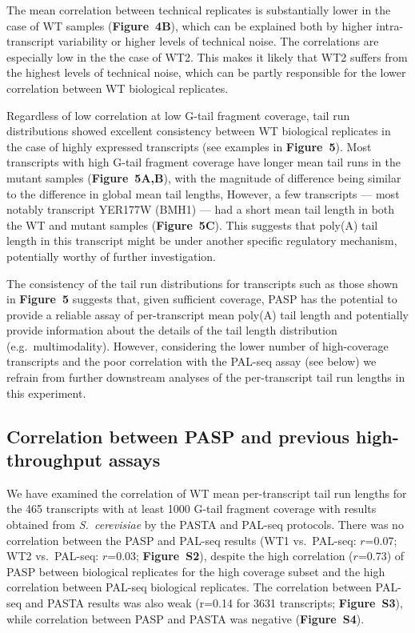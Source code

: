 \documentclass[10pt]{article}
\begin{document}
The mean correlation between technical replicates is substantially lower in the case of WT samples (\textbf{Figure~4B}), which can be explained both by higher intra-transcript variability or higher levels of technical noise. The correlations are especially low in the the case of WT2. This makes it likely that WT2 suffers from the highest levels of technical noise, which can be partly responsible for the lower correlation between WT biological replicates.

Regardless of low correlation at low G-tail fragment coverage, tail run distributions showed excellent consistency between WT biological replicates in the case of highly expressed transcripts (see examples in \textbf{Figure~5}). Most transcripts with high G-tail fragment coverage have longer mean tail runs in the mutant samples (\textbf{Figure~5A,B}), with the magnitude of difference being similar to the difference in global mean tail lengths, However, a few transcripts --- most notably transcript YER177W (BMH1) --- had a short mean tail length in both the WT and mutant samples (\textbf{Figure~5C}). This suggests that poly(A) tail length in this transcript might be under another specific regulatory mechanism, potentially worthy of further investigation.

The consistency of the tail run distributions for transcripts such as those shown in \textbf{Figure~5} suggests that, given sufficient coverage, PASP has the potential to provide a reliable assay of per-transcript mean poly(A) tail length and potentially provide information about the details of the tail length distribution (e.g.~multimodality). However, considering the lower number of high-coverage transcripts and the poor correlation with the PAL-seq assay (see below) we refrain from further downstream analyses of the per-transcript tail run lengths in this experiment.

\subsection*{Correlation between PASP and previous high-throughput assays}

We have examined the correlation of WT mean per-transcript tail run lengths for the 465 transcripts with at least 1000 G-tail fragment coverage with results obtained from \textit{S.~cerevisiae} by the PASTA \cite{beilharz07} and PAL-seq \cite{subtelny14} protocols. There was no correlation between the PASP and PAL-seq results (WT1 vs.\ PAL-seq: $r$=0.07; WT2 vs.\ PAL-seq: $r$=0.03; \textbf{Figure~S2}), despite the high correlation ($r$=0.73) of PASP between biological replicates for the high coverage subset and the high correlation between PAL-seq biological replicates. The correlation between PAL-seq and PASTA results was also weak (r=0.14 for 3631 transcripts; \textbf{Figure~S3}), while correlation between PASP and PASTA was negative (\textbf{Figure~S4}).
\end{document}

